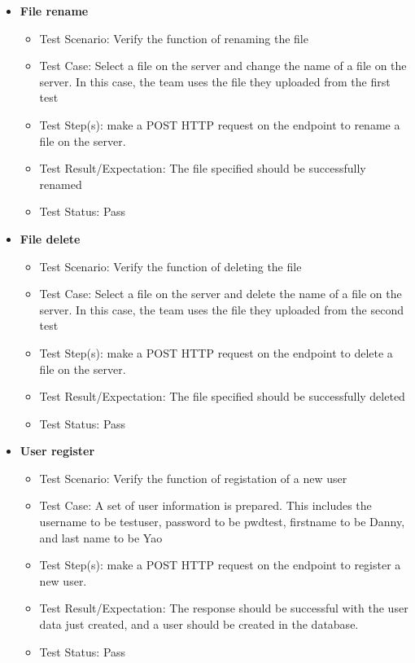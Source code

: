 \documentclass{article}
\begin{document}
\begin{itemize}
\item\textbf{File rename}
\begin{itemize}
        \item{Test Scenario: Verify the function of renaming the file}
        \item{Test Case: Select a file on the server and change the name of a file on the server. In this case, the team uses the file they uploaded from the first test}
        \item{Test Step(s): make a POST HTTP request on the endpoint to rename a file on the server.}
        \item{Test Result/Expectation: The file specified should be successfully renamed}
        \item{Test Status: Pass}
\end{itemize}
\item\textbf{File delete}
\begin{itemize}
        \item{Test Scenario: Verify the function of deleting the file}
        \item{Test Case: Select a file on the server and delete the name of a file on the server. In this case, the team uses the file they uploaded from the second test}
        \item{Test Step(s): make a POST HTTP request on the endpoint to delete a file on the server.}
        \item{Test Result/Expectation: The file specified should be successfully deleted}
        \item{Test Status: Pass}
\end{itemize}
\item\textbf{User register}
\begin{itemize}
        \item{Test Scenario: Verify the function of registation of a new user}
        \item{Test Case: A set of user information is prepared. This includes the username to be testuser, password to be pwdtest, firstname to be Danny, and last name to be Yao}
        \item{Test Step(s): make a POST HTTP request on the endpoint to register a new user.}
        \item{Test Result/Expectation: The response should be successful with the user data just created, and a user should be created in the database.}
        \item{Test Status: Pass}
\end{itemize}

\end{itemize}
\end{document}
